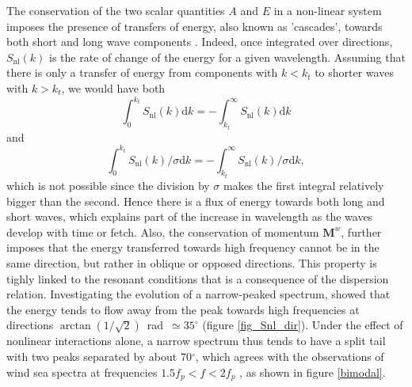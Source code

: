 The conservation of the two scalar quantities $A$ and $E$ in  a non-linear system imposes the presence of transfers of energy, also known as 'cascades', towards 
both short and long wave components \citep{Zakharov&Zaslavskii1982}. 
Indeed, once integrated over directions, $S_{\mathrm{nl}}(k)$ is the rate of change of the energy for a given wavelength. 
Assuming that there is only a transfer of energy from components with $k< k_t$ to shorter waves with $k > k_t$, we would have both 
\begin{equation}
\int_0^{k_t} S_{\mathrm{nl}}(k) \mathrm{d} k= - \int_{k_t}^{\infty} S_{\mathrm{nl}}(k) \mathrm{d} k
\end{equation}
 and 
\begin{equation}
\int_0^{k_t} S_{\mathrm{nl}}(k)/\sigma \mathrm{d} k= - \int_{k_t}^{\infty} S_{\mathrm{nl}}(k)/\sigma \mathrm{d} k,
\end{equation}
 which is not possible since the division by 
$\sigma$ makes the first integral relatively bigger than the second. 
Hence there is a flux of energy towards both long and short waves, which explains part of the increase in wavelength as the waves develop with time or fetch. 
Also, the conservation of momentum $\mathbf M^w$, further imposes that the energy transferred towards high frequency cannot be in the same direction, but rather in oblique 
or opposed directions. This property is tighly linked to the resonant conditions that is a consequence of the dispersion relation. 
Investigating the evolution of a narrow-peaked spectrum, \cite{Longuet-Higgins1976} showed that the energy tends to flow away from the peak towards high frequencies
at directions  $\arctan(1/\sqrt{2})$~rad~$\simeq 35^{\circ}$ (figure \ref{fig_Snl_dir}). Under the effect of nonlinear interactions alone, a narrow 
spectrum thus tends to have a split tail with two peaks separated by about  70$^{\circ}$, which agrees with the observations 
of wind sea spectra at frequencies $1.5 f_p < f < 2 f_p$ \citep{Hwang&al.2000b,Long&Resio2007}, as shown in figure \ref{bimodal}.
